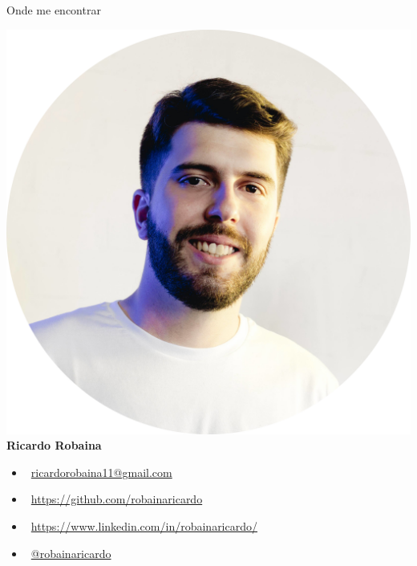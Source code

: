 \documentclass[aspectratio=1610]{beamer}}
\begin{document}
\begin{frame}{Onde me encontrar}

		\centering
		\includegraphics[scale = 0.1]{fig/fig_eu.png} \\
		\textbf{Ricardo Robaina} \\
		\begin{itemize}{  }
			\item \faEnvelope\ \url{ricardorobaina11@gmail.com}
			\item \faGithub\ \url{https://github.com/robainaricardo}
			\item \faLinkedin\ \url{https://www.linkedin.com/in/robainaricardo/}
			\item \faInstagram\ \href{https://www.instagram.com/robainaricardo/?hl=pt-br}{\url{@robainaricardo}}
		\end{itemize}
		
		
	

\end{frame}
\end{document}
